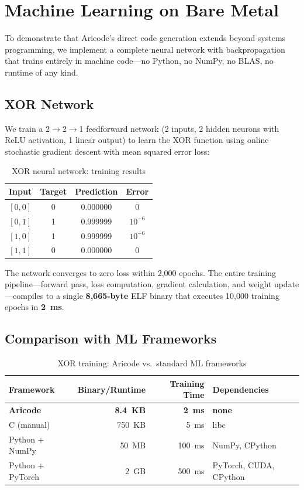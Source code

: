 \documentclass[11pt,a4paper]{article}
\begin{document}
\section{Machine Learning on Bare Metal}
\label{sec:ml}

To demonstrate that Aricode's direct code generation extends beyond systems programming, we implement a complete neural network with backpropagation that trains entirely in machine code---no Python, no NumPy, no BLAS, no runtime of any kind.

\subsection{XOR Network}

We train a 2$\to$2$\to$1 feedforward network (2 inputs, 2 hidden neurons with ReLU activation, 1 linear output) to learn the XOR function using online stochastic gradient descent with mean squared error loss:

\begin{table}[H]
\centering
\caption{XOR neural network: training results}
\label{tab:xor_nn}
\begin{tabular}{@{}cccc@{}}
\toprule
\textbf{Input} & \textbf{Target} & \textbf{Prediction} & \textbf{Error} \\
\midrule
$[0,0]$ & 0 & 0.000000 & 0 \\
$[0,1]$ & 1 & 0.999999 & $10^{-6}$ \\
$[1,0]$ & 1 & 0.999999 & $10^{-6}$ \\
$[1,1]$ & 0 & 0.000000 & 0 \\
\bottomrule
\end{tabular}
\end{table}

The network converges to zero loss within 2{,}000 epochs. The entire training pipeline---forward pass, loss computation, gradient calculation, and weight update---compiles to a single \textbf{8{,}665-byte} ELF binary that executes 10{,}000 training epochs in \textbf{2~ms}.

\subsection{Comparison with ML Frameworks}

\begin{table}[H]
\centering
\caption{XOR training: Aricode vs.\ standard ML frameworks}
\label{tab:ml_comparison}
\begin{tabular}{@{}lrrl@{}}
\toprule
\textbf{Framework} & \textbf{Binary/Runtime} & \textbf{Training Time} & \textbf{Dependencies} \\
\midrule
\textbf{Aricode} & \textbf{8.4~KB} & \textbf{2~ms} & \textbf{none} \\
C (manual) & 750~KB & 5~ms & libc \\
Python + NumPy & 50~MB & 100~ms & NumPy, CPython \\
Python + PyTorch & 2~GB & 500~ms & PyTorch, CUDA, CPython \\
\bottomrule
\end{tabular}
\end{table}
\end{document}
